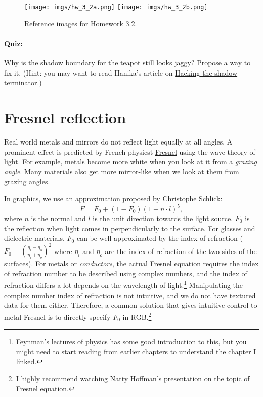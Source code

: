 \begin{figure}[ht]
    \centering
    \texttt{[image: imgs/hw\_3\_2a.png]}
    \texttt{[image: imgs/hw\_3\_2b.png]}
    \caption{Reference images for Homework 3.2.}
    \label{fig:hw_3_2}
\end{figure}

\paragraph{Quiz:} Why is the shadow boundary for the teapot still looks jaggy? Propose a way to fix it. (Hint: you may want to read Hanika's article on \href{https://jo.dreggn.org/home/2021_terminator.pdf}{Hacking the shadow terminator}.)

\section{Fresnel reflection}
Real world metals and mirrors do not reflect light equally at all angles. A prominent effect is predicted by French physicst \href{https://en.wikipedia.org/wiki/Augustin-Jean_Fresnel}{Fresnel} using the wave theory of light. For example, metals become more white when you look at it from a \emph{grazing angle}. Many materials also get more mirror-like when we look at them from grazing angles.

In graphics, we use an approximation proposed by \href{https://en.wikipedia.org/wiki/Schlick%27s_approximation}{Christophe Schlick}:
\begin{equation}
F = F_0 + (1 - F_0) \left(1 - n \cdot l\right)^5,
\label{eq:fresnel}
\end{equation}
where $n$ is the normal and $l$ is the unit direction towards the light source. $F_0$ is the reflection when light comes in perpendicularly to the surface. For glasses and dielectric materials, $F_0$ can be well approximated by the index of refraction ($F_0 = \left(\frac{\eta_i - \eta_o}{\eta_i + \eta_o}\right)^2$ where $\eta_i$ and $\eta_o$ are the index of refraction of the two sides of the surfaces). For metals or \emph{conductors}, the actual Fresnel equation requires the index of refraction number to be described using complex numbers, and the index of refraction differs a lot depends on the wavelength of light.\footnote{\href{https://www.feynmanlectures.caltech.edu/I_31.html}{Feynman's lectures of physics} has some good introduction to this, but you might need to start reading from earlier chapters to understand the chapter I linked.} Manipulating the complex number index of refraction is not intuitive, and we do not have textured data for them either. Therefore, a common solution that gives intuitive control to metal Fresnel is to directly specify $F_0$ in RGB.\footnote{I highly recommend watching \href{https://www.youtube.com/watch?v=kEcDbl7eS0w}{Natty Hoffman's presentation} on the topic of Fresnel equation.}

